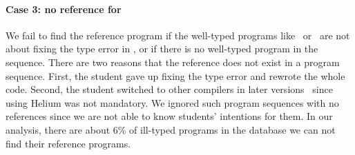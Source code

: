 \documentclass[12pt]{report}	%
\begin{document}
\paragraph{Case 3: no reference for \pgi}
%
We fail to find the reference program 
if the well-typed programs like \pgj\ or \pgk\
are not about fixing the type error in \pgi,
or if there is no well-typed program in the sequence.
There are two reasons that the reference does not exist in a program sequence.
First, the student gave up
fixing the type error and rewrote the whole code.
Second, the student switched to other compilers in later
versions~\cite{Keeken06:AHP} since using Helium was not mandatory.
We ignored such program sequences with no references since we are
not able to know students' intentions for them.
In our analysis, there are about 6\% of ill-typed programs
in the database we can not find their reference programs.
\end{document}
